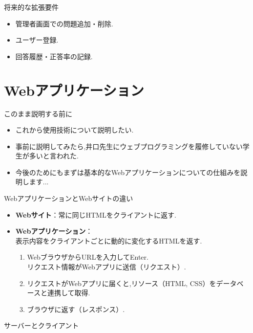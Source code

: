 \documentclass[aspectratio=169]{beamer}
\begin{document}
\begin{frame}{将来的な拡張要件}
    \begin{itemize}
        \setlength{\parskip}{1.5em}
        \item 管理者画面での問題追加・削除.
        \item ユーザー登録.
        \item 回答履歴・正答率の記録.
    \end{itemize}
\end{frame}

\section{Webアプリケーション}

\begin{frame}{このまま説明する前に}
    \begin{itemize}
        \setlength{\parskip}{1.5em}
        \item これから使用技術について説明したい.
        \item 事前に説明してみたら,井口先生にウェブプログラミングを履修していない学生が多いと言われた.
        \item 今後のためにもまずは基本的なWebアプリケーションについての仕組みを説明します...
    \end{itemize}
\end{frame}
\begin{frame}{WebアプリケーションとWebサイトの違い}
    \begin{itemize}
        \setlength{\parskip}{1.5em}
        \item \textbf{Webサイト}：常に同じHTMLをクライアントに返す.
        \item \textbf{Webアプリケーション}：\\表示内容をクライアントごとに動的に変化するHTMLを返す.
        \begin{enumerate}
            \setlength{\parskip}{1em}
            \item WebブラウザからURLを入力してEnter.\\リクエスト情報がWebアプリに送信（リクエスト）.
            \item リクエストがWebアプリに届くと,リソース（HTML, CSS）をデータベースと連携して取得.
            \item ブラウザに返す（レスポンス）.
        \end{enumerate}
    \end{itemize}
\end{frame}

\begin{frame}{サーバーとクライアント}
    
\end{frame}
\end{document}
